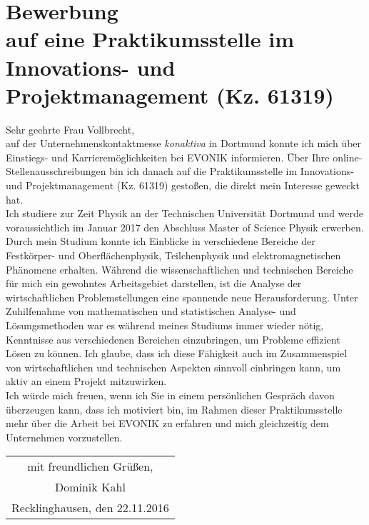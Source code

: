 \documentclass[12pt]{scrartcl}
\begin{document}
\pagestyle{empty}

\section*{Bewerbung \\
auf eine Praktikumsstelle im Innovations- und Projektmanagement (Kz. 61319)}

\vspace{0.7in}

Sehr geehrte Frau Vollbrecht,
\\

auf der Unternehmenskontaktmesse \textit{konaktiva} in Dortmund konnte 
ich mich über Ein\-stiegs- und 
Karrieremöglichkeiten bei EVONIK informieren. Über Ihre 
online-Stellen\-aus\-schrei\-bungen bin ich danach auf die Praktikumsstelle im 
Innovations- und Projektmanagement (Kz. 61319) gestoßen, die direkt mein Interesse geweckt 
hat.
\\

Ich studiere zur Zeit Physik an der Technischen Universität Dortmund und 
werde voraussichtlich im Januar 2017 den Abschluss Master of Science Physik 
erwerben. Durch mein Studium konnte ich Einblicke in verschiedene 
Bereiche der Festkörper- und Oberflächenphysik, Teilchenphysik und 
elektromagnetischen Phänomene erhalten.
Während die wissenschaftlichen und 
technischen Bereiche für mich ein gewohntes Arbeitsgebiet darstellen, ist 
die Analyse der wirtschaftlichen Problemstellungen eine spannende neue 
Herausforderung.
Unter Zuhilfenahme von mathematischen 
und statistischen Analyse- und Lösungsmethoden war es während meines Studiums  
immer wieder nötig, 
Kenntnisse 
aus verschiedenen Bereichen einzubringen, um Probleme effizient 
Lösen zu können. Ich glaube, dass ich diese Fähigkeit auch im Zusammenspiel 
von wirtschaftlichen und technischen Aspekten sinnvoll einbringen kann, um 
aktiv an einem Projekt mitzuwirken. 
\\

Ich würde mich freuen, wenn ich Sie in einem persönlichen Gespräch davon 
überzeugen kann, dass ich motiviert bin, im Rahmen dieser Praktikumsstelle 
mehr über die Arbeit bei EVONIK zu erfahren und mich gleichzeitig dem 
Unternehmen vorzustellen.
\\

\begin{flushright}
\begin{tabular}{c}
mit freundlichen Grüßen, 		\\[0.2cm]
Dominik Kahl 					\\[0.2cm]
Recklinghausen, den 22.11.2016 	\\[0.3cm]
\end{tabular}
\end{flushright}
\end{document}
